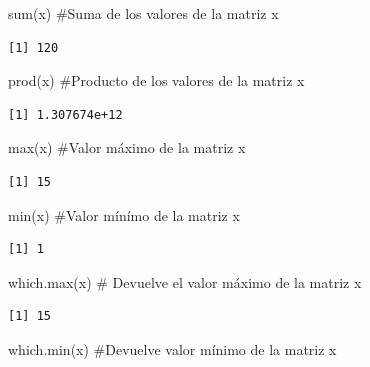 \documentclass[
  letterpaper,
]{scrbook}
\newenvironment{Shaded}{\begin{snugshade}}{\end{snugshade}}
\newcommand{\CommentTok}[1]{\textcolor[rgb]{0.37,0.37,0.37}{#1}}
\newcommand{\FunctionTok}[1]{\textcolor[rgb]{0.28,0.35,0.67}{#1}}
\newcommand{\NormalTok}[1]{\textcolor[rgb]{0.00,0.23,0.31}{#1}}
\begin{document}
\begin{Shaded}
\begin{Highlighting}[]
\FunctionTok{sum}\NormalTok{(x) }\CommentTok{\#Suma de los valores de la matriz x}
\end{Highlighting}
\end{Shaded}

\begin{verbatim}
[1] 120
\end{verbatim}

\begin{Shaded}
\begin{Highlighting}[]
\FunctionTok{prod}\NormalTok{(x) }\CommentTok{\#Producto de los valores de la matriz x}
\end{Highlighting}
\end{Shaded}

\begin{verbatim}
[1] 1.307674e+12
\end{verbatim}

\begin{Shaded}
\begin{Highlighting}[]
\FunctionTok{max}\NormalTok{(x) }\CommentTok{\#Valor máximo de la matriz x}
\end{Highlighting}
\end{Shaded}

\begin{verbatim}
[1] 15
\end{verbatim}

\begin{Shaded}
\begin{Highlighting}[]
\FunctionTok{min}\NormalTok{(x) }\CommentTok{\#Valor mínímo de la matriz x}
\end{Highlighting}
\end{Shaded}

\begin{verbatim}
[1] 1
\end{verbatim}

\begin{Shaded}
\begin{Highlighting}[]
\FunctionTok{which.max}\NormalTok{(x) }\CommentTok{\# Devuelve el valor máximo de la matriz x}
\end{Highlighting}
\end{Shaded}

\begin{verbatim}
[1] 15
\end{verbatim}

\begin{Shaded}
\begin{Highlighting}[]
\FunctionTok{which.min}\NormalTok{(x) }\CommentTok{\#Devuelve valor mínimo de la matriz x}
\end{Highlighting}
\end{Shaded}
\end{document}
